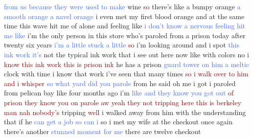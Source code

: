 \textcolor{RoyalBlue}{from} \textcolor{RoyalBlue}{us} \textcolor{RoyalBlue}{because} \textcolor{RoyalBlue}{they} \textcolor{RoyalBlue}{were} \textcolor{RoyalBlue}{used} \textcolor{RoyalBlue}{to} \textcolor{RoyalBlue}{make} wine \textcolor{Maroon}{so} there's like a bumpy orange \textcolor{RoyalBlue}{a} \textcolor{RoyalBlue}{smooth} \textcolor{RoyalBlue}{orange} \textcolor{RoyalBlue}{a} \textcolor{RoyalBlue}{navel} \textcolor{RoyalBlue}{orange} i even met my first blood orange and at the same time this wave hit me of alone and feeling like \textcolor{RoyalBlue}{i} \textcolor{RoyalBlue}{don't} \textcolor{RoyalBlue}{know} \textcolor{RoyalBlue}{a} \textcolor{RoyalBlue}{nervous} \textcolor{RoyalBlue}{feeling} \textcolor{RoyalBlue}{hit} \textcolor{RoyalBlue}{me} \textcolor{RoyalBlue}{like} i'm the only person in this store who's paroled from a prison today after twenty six years \textcolor{RoyalBlue}{i'm} \textcolor{RoyalBlue}{a} \textcolor{RoyalBlue}{little} \textcolor{RoyalBlue}{stuck} \textcolor{RoyalBlue}{a} \textcolor{RoyalBlue}{little} \textcolor{Maroon}{so} i'm looking around and i spot \textcolor{RoyalBlue}{this} \textcolor{RoyalBlue}{ink} \textcolor{RoyalBlue}{work} \textcolor{RoyalBlue}{it's} not the typical ink work that i see out here now like with colors no i \textcolor{Maroon}{know} \textcolor{Maroon}{this} \textcolor{Maroon}{ink} \textcolor{Maroon}{work} \textcolor{Maroon}{this} \textcolor{Maroon}{is} \textcolor{Maroon}{prison} \textcolor{Maroon}{ink} he has a prison \textcolor{RoyalBlue}{guard} \textcolor{RoyalBlue}{tower} \textcolor{RoyalBlue}{on} \textcolor{RoyalBlue}{him} \textcolor{RoyalBlue}{a} \textcolor{RoyalBlue}{meltic} clock with time i know that work i've seen that many times \textcolor{Maroon}{so} \textcolor{Maroon}{i} \textcolor{Maroon}{walk} \textcolor{Maroon}{over} \textcolor{Maroon}{to} \textcolor{Maroon}{him} \textcolor{Maroon}{and} \textcolor{Maroon}{i} \textcolor{Maroon}{whisper} \textcolor{RoyalBlue}{so} \textcolor{RoyalBlue}{what} \textcolor{RoyalBlue}{yard} \textcolor{RoyalBlue}{did} \textcolor{RoyalBlue}{you} \textcolor{RoyalBlue}{parole} from he said oh me i got i paroled from pelican bay like four months ago i'm \textcolor{RoyalBlue}{like} \textcolor{RoyalBlue}{and} \textcolor{RoyalBlue}{they} \textcolor{RoyalBlue}{know} \textcolor{RoyalBlue}{you} \textcolor{RoyalBlue}{got} \textcolor{RoyalBlue}{out} \textcolor{Maroon}{of} \textcolor{Maroon}{prison} \textcolor{Maroon}{they} \textcolor{Maroon}{know} \textcolor{Maroon}{you} \textcolor{Maroon}{on} \textcolor{Maroon}{parole} \textcolor{Maroon}{aw} \textcolor{Maroon}{yeah} \textcolor{Maroon}{they} \textcolor{Maroon}{not} \textcolor{Maroon}{tripping} \textcolor{Maroon}{here} \textcolor{Maroon}{this} \textcolor{Maroon}{is} \textcolor{Maroon}{berkeley} \textcolor{Maroon}{man} \textcolor{Maroon}{nah} \textcolor{Maroon}{nobody's} tripping \textcolor{Maroon}{well} i walked away from him with the understanding that if he \textcolor{RoyalBlue}{can} \textcolor{RoyalBlue}{get} \textcolor{RoyalBlue}{a} \textcolor{RoyalBlue}{job} \textcolor{RoyalBlue}{so} \textcolor{RoyalBlue}{can} \textcolor{RoyalBlue}{i} so i met my wife at the checkout once again there's another \textcolor{RoyalBlue}{stunned} \textcolor{RoyalBlue}{moment} \textcolor{RoyalBlue}{for} \textcolor{RoyalBlue}{me} there are twelve checkout 